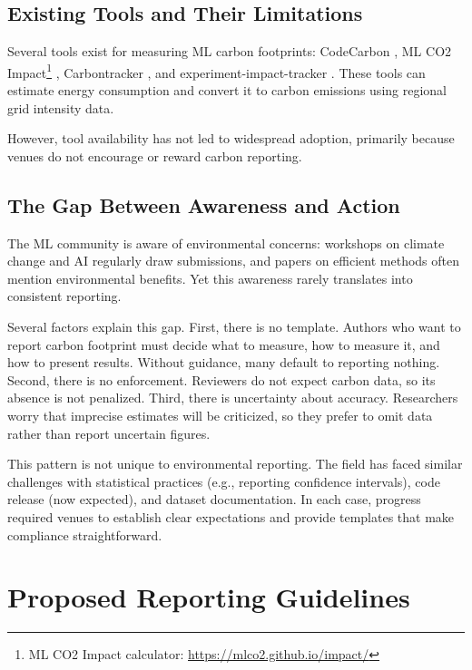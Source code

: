 \documentclass{article}
\theoremstyle{plain}
\theoremstyle{definition}
\theoremstyle{remark}
\begin{document}
\subsection{Existing Tools and Their Limitations}

Several tools exist for measuring ML carbon footprints: CodeCarbon \cite{codecarbon2020}, ML CO2 Impact\footnote{ML CO2 Impact calculator: \url{https://mlco2.github.io/impact/}} \cite{lacoste2019quantifying}, Carbontracker \cite{anthony2020carbontracker}, and experiment-impact-tracker \cite{henderson2020towards}. These tools can estimate energy consumption and convert it to carbon emissions using regional grid intensity data.

However, tool availability has not led to widespread adoption, primarily because venues do not encourage or reward carbon reporting.

\subsection{The Gap Between Awareness and Action}

The ML community is aware of environmental concerns: workshops on climate change and AI regularly draw submissions, and papers on efficient methods often mention environmental benefits. Yet this awareness rarely translates into consistent reporting.

Several factors explain this gap. First, there is no template. Authors who want to report carbon footprint must decide what to measure, how to measure it, and how to present results. Without guidance, many default to reporting nothing. Second, there is no enforcement. Reviewers do not expect carbon data, so its absence is not penalized. Third, there is uncertainty about accuracy. Researchers worry that imprecise estimates will be criticized, so they prefer to omit data rather than report uncertain figures.

This pattern is not unique to environmental reporting. The field has faced similar challenges with statistical practices (e.g., reporting confidence intervals), code release (now expected), and dataset documentation. In each case, progress required venues to establish clear expectations and provide templates that make compliance straightforward.

\section{Proposed Reporting Guidelines}
\end{document}
